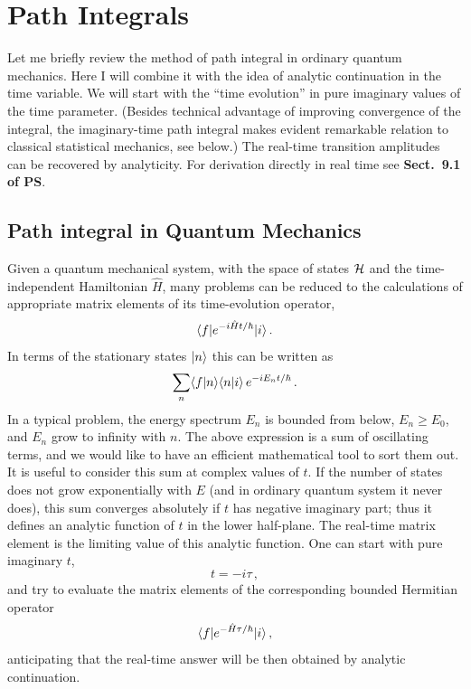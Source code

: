 \section{Path Integrals}

Let me briefly review the method of path integral in ordinary quantum
mechanics. Here I will combine it with the idea of analytic continuation in
the time variable. We will start with the ``time evolution'' in pure imaginary
values of the time parameter. (Besides technical advantage of improving
convergence of the integral, the imaginary-time path integral makes evident
remarkable relation to classical statistical mechanics, see below.) The
real-time transition amplitudes can be recovered by analyticity. For
derivation directly in real time see \textbf{Sect.~9.1 of PS}.

\subsection*{Path integral in Quantum Mechanics}

Given a quantum mechanical system, with the space of states $\mathcal{H}$ and the
time-independent Hamiltonian $\hat H$, many problems can be reduced to the
calculations of appropriate matrix elements of its time-evolution operator,
\[
\langle f|e^{-i\hat Ht/\hbar}|i\rangle\,.
\]
In terms of the stationary states $|n\rangle$ this can be written as
\[
\sum_n\langle f|n\rangle\langle n|i\rangle\,e^{-iE_nt/\hbar}\,.
\]
In a typical problem, the energy spectrum $E_n$ is bounded from below,
$E_n\ge E_0$, and $E_n$ grow to infinity with $n$. The above expression is a
sum of oscillating terms, and we would like to have an efficient mathematical
tool to sort them out. It is useful to consider this sum at complex values of
$t$. If the number of states does not grow exponentially with $E$ (and in
ordinary quantum system it never does), this sum converges absolutely if $t$
has negative imaginary part; thus it defines an analytic function of $t$ in
the lower half-plane. The real-time matrix element is the limiting value of
this analytic function. One can start with pure imaginary $t$,
\[
t=-i\tau\,,
\]
and try to evaluate the matrix elements of the corresponding bounded Hermitian
operator
\[
\langle f|e^{-\hat H\tau/\hbar}|i\rangle\,,
\]
anticipating that the real-time answer will be then obtained by analytic
continuation.

